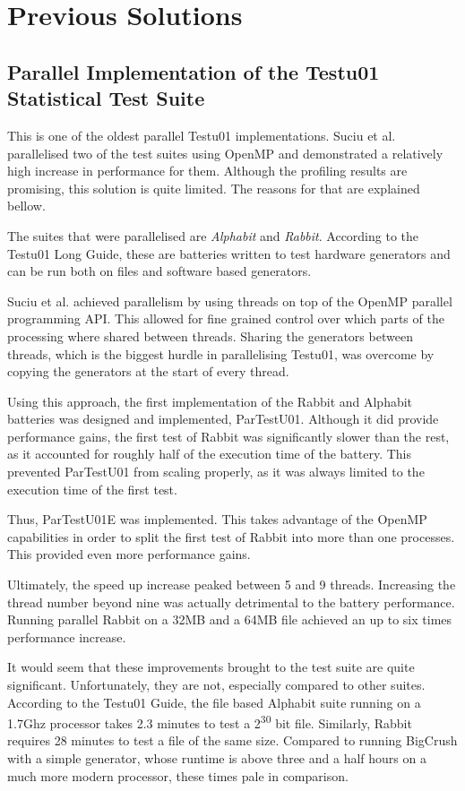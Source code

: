 \section{Previous Solutions}
\subsection{Parallel Implementation of the Testu01 Statistical Test Suite}
This is one of the oldest parallel Testu01 implementations. Suciu et al. parallelised two of the test suites using OpenMP and demonstrated a relatively high increase in performance for them. Although the profiling results are promising, this solution is quite limited. The reasons for that are explained bellow.

The suites that were parallelised are \textit{Alphabit} and \textit{Rabbit}. According to the Testu01 Long Guide\cite{longguide-alphabit}, these are batteries written to test hardware generators and can be run both on files and software based generators.

Suciu et al. achieved parallelism by using threads on top of the OpenMP parallel programming API\cite{openmp}. This allowed for fine grained control over which parts of the processing where shared between threads. Sharing the generators between threads, which is the biggest hurdle in parallelising Testu01, was overcome by copying the generators at the start of every thread. 

Using this approach, the first implementation of the Rabbit and Alphabit batteries was designed and implemented, ParTestU01. Although it did provide performance gains, the first test of Rabbit was significantly slower than the rest, as it accounted for roughly half of the execution time of the battery. This prevented ParTestU01 from scaling properly, as it was always limited to the execution time of the first test.

Thus, ParTestU01E was implemented. This takes advantage of the OpenMP capabilities in order to split the first test of Rabbit into more than one processes. This provided even more performance gains.

Ultimately, the speed up increase peaked between 5 and 9 threads. Increasing the thread number beyond nine was actually detrimental to the battery performance. Running parallel Rabbit on a 32MB and a 64MB file achieved an up to six times performance increase.

It would seem that these improvements brought to the test suite are quite significant. Unfortunately, they are not, especially compared to other suites. According to the Testu01 Guide, the file based Alphabit suite running on a 1.7Ghz processor takes 2.3 minutes to test a 2\textsuperscript{30} bit file. Similarly, Rabbit requires 28 minutes to test a file of the same size. Compared to running BigCrush with a simple generator, whose runtime is above three and a half hours on a much more modern processor, these times pale in comparison.

